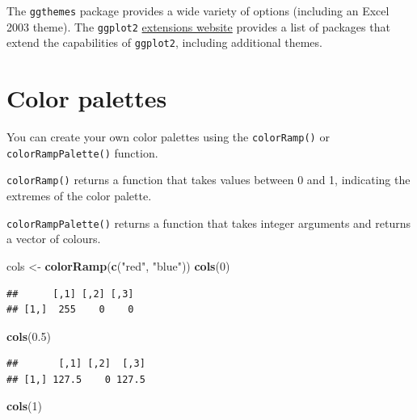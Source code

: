 \documentclass[
]{book}
\newenvironment{Shaded}{\begin{snugshade}}{\end{snugshade}}
\newcommand{\DecValTok}[1]{\textcolor[rgb]{0.00,0.00,0.81}{#1}}
\newcommand{\FloatTok}[1]{\textcolor[rgb]{0.00,0.00,0.81}{#1}}
\newcommand{\KeywordTok}[1]{\textcolor[rgb]{0.13,0.29,0.53}{\textbf{#1}}}
\newcommand{\NormalTok}[1]{#1}
\newcommand{\StringTok}[1]{\textcolor[rgb]{0.31,0.60,0.02}{#1}}
\begin{document}
The \texttt{ggthemes} package provides a wide variety of options (including an Excel 2003 theme). The \texttt{ggplot2} \href{https://www.ggplot2-exts.org}{extensions website} provides a list of packages that extend the capabilities of \texttt{ggplot2}, including additional themes.

\hypertarget{color-palettes}{%
\section{Color palettes}\label{color-palettes}}

You can create your own color palettes using the \texttt{colorRamp()} or \texttt{colorRampPalette()} function.

\texttt{colorRamp()} returns a function that takes values between 0 and 1, indicating the extremes of the color palette.

\texttt{colorRampPalette()} returns a function that takes integer arguments and returns a vector of colours.

\begin{Shaded}
\begin{Highlighting}[]
\NormalTok{cols <-}\StringTok{ }\KeywordTok{colorRamp}\NormalTok{(}\KeywordTok{c}\NormalTok{(}\StringTok{"red"}\NormalTok{, }\StringTok{"blue"}\NormalTok{))}
\KeywordTok{cols}\NormalTok{(}\DecValTok{0}\NormalTok{)}
\end{Highlighting}
\end{Shaded}

\begin{verbatim}
##      [,1] [,2] [,3]
## [1,]  255    0    0
\end{verbatim}

\begin{Shaded}
\begin{Highlighting}[]
\KeywordTok{cols}\NormalTok{(}\FloatTok{0.5}\NormalTok{)}
\end{Highlighting}
\end{Shaded}

\begin{verbatim}
##       [,1] [,2]  [,3]
## [1,] 127.5    0 127.5
\end{verbatim}

\begin{Shaded}
\begin{Highlighting}[]
\KeywordTok{cols}\NormalTok{(}\DecValTok{1}\NormalTok{)}
\end{Highlighting}
\end{Shaded}
\end{document}
